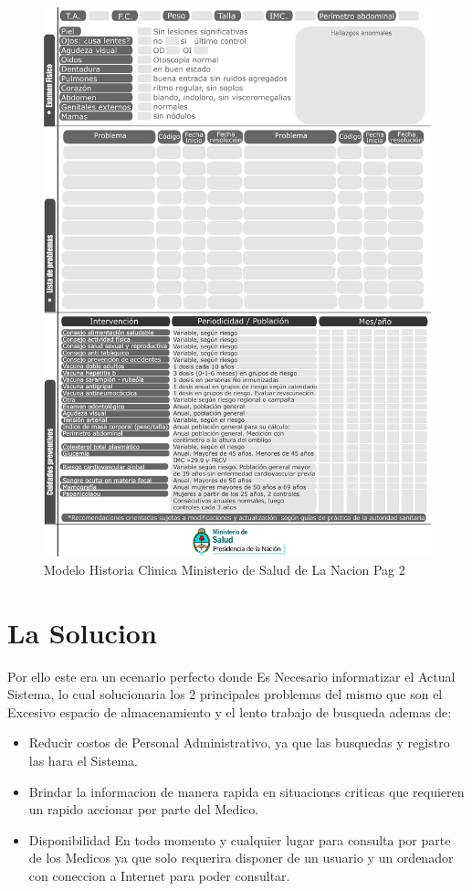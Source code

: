 \begin{figure}[H]
    \centering
    \includegraphics[scale=0.7]{resourse/historia-clinica-d.jpg}
    \caption{Modelo Historia Clinica Ministerio de Salud de La Nacion Pag 2}
    \label{fig:07}
\end{figure}  




\section{La Solucion}

Por ello este era un ecenario perfecto donde Es Necesario informatizar el
Actual Sistema, lo cual solucionaria los 2 principales problemas del mismo
que son el Excesivo espacio de almacenamiento y el lento trabajo de busqueda
ademas de:

\begin{itemize}
    \item Reducir costos de Personal Administrativo, ya que las busquedas y registro las hara el Sistema.
    \item Brindar la informacion de manera rapida en situaciones criticas que requieren un rapido accionar por parte del
    Medico.
    \item Disponibilidad En todo momento y cualquier lugar para consulta por parte de los Medicos ya que solo requerira
        disponer de un usuario y un ordenador con coneccion a Internet para poder consultar.
\end{itemize}


